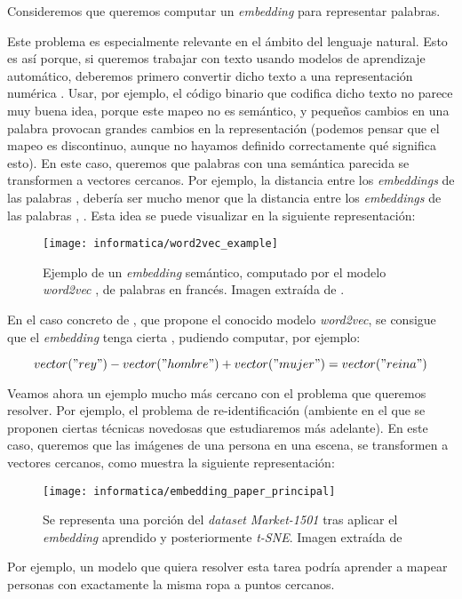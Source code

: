 \begin{ejemplo}
	Consideremos que queremos computar un \textit{embedding} para representar palabras.

	Este problema es especialmente relevante en el ámbito del lenguaje natural. Esto es así porque, si queremos trabajar con texto usando modelos de aprendizaje automático, deberemos primero convertir dicho texto a una representación numérica \cite{informatica:word_embeddings_survey}. Usar, por ejemplo, el código binario que codifica dicho texto no parece muy buena idea, porque este mapeo no es semántico, y pequeños cambios en una palabra provocan grandes cambios en la representación (podemos pensar que el mapeo es discontinuo, aunque no hayamos definido correctamente qué significa esto). En este caso, queremos que palabras con una semántica parecida se transformen a vectores cercanos. Por ejemplo, la distancia entre los \textit{embeddings} de las palabras ,  debería ser mucho menor que la distancia entre los \textit{embeddings} de las palabras , . Esta idea se puede visualizar en la siguiente representación:

	\begin{figure}[H]
		\centering
		\texttt{[image: informatica/word2vec\_example]}
		\caption{Ejemplo de un \textit{embedding} semántico, computado por el modelo \textit{word2vec} \cite{informatica:word2vec}, de palabras en francés. Imagen extraída de \cite{informatica:word2vec_cran_package}.}
	\end{figure}

	En el caso concreto de \cite{informatica:word2vec}, que propone el conocido modelo \textit{word2vec}, se consigue que el \textit{embedding} tenga cierta , pudiendo computar, por ejemplo:

	\begin{equation}
		vector("rey") - vector("hombre") + vector("mujer") = vector("reina")
	\end{equation}
\end{ejemplo}

\begin{ejemplo}
	Veamos ahora un ejemplo mucho más cercano con el problema que queremos resolver. Por ejemplo, el problema de re-identificación (ambiente en el que se proponen ciertas técnicas novedosas que estudiaremos más adelante). En este caso, queremos que las imágenes de una persona en una escena, se transformen a vectores cercanos, como muestra la siguiente representación:

	\begin{figure}[H]
		\centering
		\texttt{[image: informatica/embedding\_paper\_principal]}
		\caption{Se representa una porción del \textit{dataset} \textit{Market-1501} tras aplicar el \textit{embedding} aprendido y posteriormente \textit{t-SNE}. Imagen extraída de \cite{informatica:principal}}
	\end{figure}

	Por ejemplo, un modelo que quiera resolver esta tarea podría aprender a mapear personas con exactamente la misma ropa a puntos cercanos.
\end{ejemplo}

